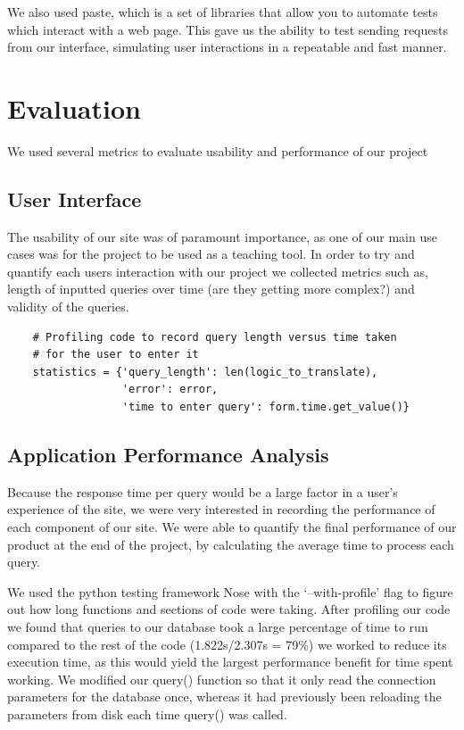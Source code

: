\documentclass[a4paper, 11pt]{article}
\begin{document}
  We also used paste, which is a set of libraries that allow you to automate
  tests which interact with a web page. This gave us the ability to test
  sending requests from our interface, simulating user interactions in a
  repeatable and fast manner.


\section{Evaluation}

    We used several metrics to evaluate usability and performance of our project
    \subsection{User Interface}
    The usability of our site was of paramount importance, as one of our main
    use cases was for the project to be used as a teaching tool. In order to try
    and quantify each users interaction with our project we collected metrics
    such as, length of inputted queries over time (are they getting more
    complex?) and validity of the queries.

    \begin{verbatim}
    # Profiling code to record query length versus time taken
    # for the user to enter it
    statistics = {'query_length': len(logic_to_translate),
                  'error': error,
                  'time to enter query': form.time.get_value()}
    \end{verbatim}

    \subsection{Application Performance Analysis}

    Because the response time per query would be a large factor in a user's
    experience of the site, we were very interested in recording the performance
    of each component of our site. We were able to quantify the final
    performance of our product at the end of the project, by calculating the
    average time to process each query.

    We used the python testing framework Nose with the `--with-profile' flag to
    figure out how long functions and sections of code were taking. 
    After profiling our code we found that queries to our database took a large
    percentage of time to run compared to the rest of the code (1.822s/2.307s =
    79\%) we worked to reduce its execution time, as this would yield the largest
    performance benefit for time spent working. 
    We modified our query() function so that it only read the connection 
    parameters for the database once, whereas it had previously been reloading 
    the  parameters from disk each time query() was called.  
\end{document}

